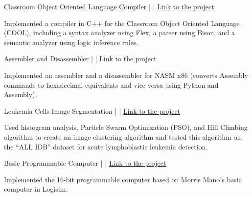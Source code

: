 
\vspace{-5pt}
\begin{cventries}
    \cvproject
    {Classroom Object Oriented Language Compiler {\normalfont |}  {\normalfont |} }
    {\href{}{\faGithub \; Link to the project}}
    {
        \begin{cvitems}
            \item {Implemented a compiler in C++ for the Classroom Object Oriented Language (COOL), including a syntax analyzer using Flex, a parser using Bison, and a semantic analyzer using logic inference rules.}
        \end{cvitems}
    }
    \vspace{-5pt}

    \cvproject
    {Assembler and Disassembler {\normalfont |}  {\normalfont |} }
    {\href{}{\faGithub \; Link to the project}}
    {
        \begin{cvitems}
            \item {Implemented an assembler and a disassembler for NASM x86 (converts Assembly commands to hexadecimal equivalents and vice versa using Python and Assembly).}
        \end{cvitems}
    }
    \vspace{-5pt}

    \cvproject
    {Leukemia Cells Image Segmentation {\normalfont |}  {\normalfont |} }{\href{}{\faGithub \; Link to the project}}
    {
        \begin{cvitems}
            \item {Used histogram analysis, Particle Swarm Optimization (PSO), and Hill Climbing algorithm to create an image clustering algorithm and tested this algorithm on the ``ALL IDB'' dataset for acute lymphoblastic leukemia detection.}
        \end{cvitems}
    }
    \vspace{-5pt}

    \cvproject
    {Basic Programmable Computer {\normalfont |}  {\normalfont |} }
    {\href{}{\faGithub \; Link to the project}}
    {
        \begin{cvitems}
            \item {Implemented the 16-bit programmable computer based on Morris Mano's basic computer in Logisim.}
        \end{cvitems}
    }
    \vspace{-5pt}
\end{cventries}
